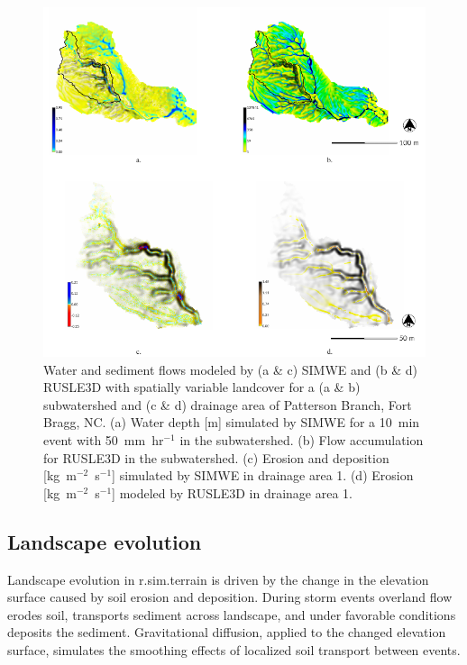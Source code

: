 \documentclass[gmd, manuscript]{copernicus}
\begin{document}
\begin{figure}
\center
\includegraphics[width=\textwidth,height=0.95\textheight,keepaspectratio]{figures/models.pdf}
\caption{Water and sediment flows 
modeled by (a \& c) SIMWE and (b \& d) RUSLE3D with spatially variable landcover 
for a (a \& b) subwatershed and (c \& d) drainage area of Patterson Branch, Fort Bragg, NC.
(a) Water depth [m] simulated by SIMWE for a 10~\unit{min} event with 50~\unit{mm~hr}$^{-1}$ in the subwatershed.
(b) Flow accumulation for RUSLE3D in the subwatershed.
(c) Erosion and deposition [\unit{kg~m}$^{-2}$~\unit{s}$^{-1}$] simulated by SIMWE in drainage area 1.
(d) Erosion [\unit{kg~m}$^{-2}$~\unit{s}$^{-1}$] modeled by RUSLE3D in drainage area 1.
}
\label{fig:models}
\end{figure}


\subsection{Landscape evolution}

Landscape evolution in r.sim.terrain 
is driven by the change in the elevation surface 
caused by soil erosion and deposition.
During storm events overland flow erodes soil, 
transports sediment across landscape, and 
under favorable conditions deposits the sediment. 
Gravitational diffusion, 
applied to the changed elevation surface, 
simulates the smoothing effects 
of localized soil transport between events.
\end{document}
